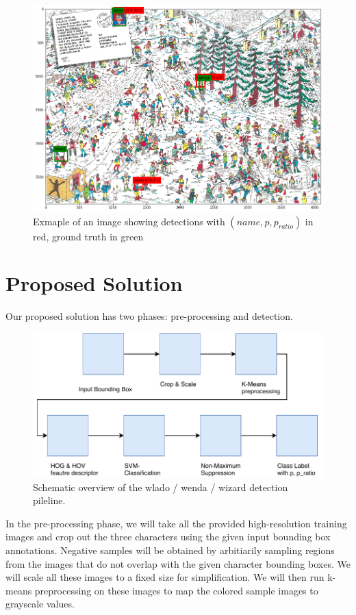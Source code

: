 \documentclass[11pt]{article}
\begin{document}
\begin{figure}[h]
    \centering
    \includegraphics[width=0.9\linewidth]{figures/waldo_winter} 
    \caption{Exmaple of an image showing detections with \( (name, p, p_{ratio}) \) in red, ground truth in green}
    \label{fig:waldo-winter}
\end{figure}

\section{Proposed Solution}
Our proposed solution has two phases: pre-processing and detection.

\begin{figure}[h]
    \centering
    \includegraphics[width=0.9\linewidth]{figures/model_overview} 
    \caption{Schematic overview of the wlado / wenda / wizard detection pileline.}
    \label{fig:model-overview}
\end{figure}

In the pre-processing phase, we will take all the provided high-resolution training images and crop out the three characters using the given input bounding box annotations. Negative samples will be obtained by arbitiarily sampling regions from the images that do not overlap with the given character bounding boxes. We will scale all these images to a fixed size for simplification. We will then run k-means preprocessing on these images to map the colored sample images to grayscale values.
\end{document}
